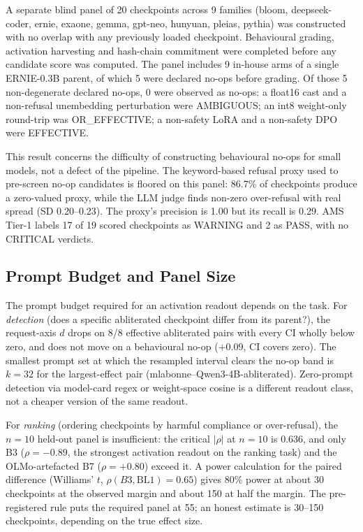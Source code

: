 \documentclass[11pt,letterpaper]{article}
\begin{document}
A separate blind panel of 20 checkpoints across 9 families (bloom, deepseek-coder, ernie, exaone, gemma, gpt-neo, hunyuan, pleias, pythia) was constructed with no overlap with any previously loaded checkpoint. Behavioural grading, activation harvesting and hash-chain commitment were completed before any candidate score was computed. The panel includes 9 in-house arms of a single ERNIE-0.3B parent, of which 5 were declared no-ops before grading. Of those 5 non-degenerate declared no-ops, 0 were observed as no-ops: a float16 cast and a non-refusal unembedding perturbation were AMBIGUOUS; an int8 weight-only round-trip was OR\_EFFECTIVE; a non-safety LoRA and a non-safety DPO were EFFECTIVE.

This result concerns the difficulty of constructing behavioural no-ops for small models, not a defect of the pipeline. The keyword-based refusal proxy used to pre-screen no-op candidates is floored on this panel: 86.7\% of checkpoints produce a zero-valued proxy, while the LLM judge finds non-zero over-refusal with real spread (SD 0.20--0.23). The proxy's precision is 1.00 but its recall is 0.29. AMS Tier-1 labels 17 of 19 scored checkpoints as WARNING and 2 as PASS, with no CRITICAL verdicts.


\subsection{Prompt Budget and Panel Size}
\label{sec:results-fewprompt}

The prompt budget required for an activation readout depends on the task. For \emph{detection} (does a specific abliterated checkpoint differ from its parent?), the request-axis $d$ drops on 8/8 effective abliterated pairs with every CI wholly below zero, and does not move on a behavioural no-op ($+0.09$, CI covers zero). The smallest prompt set at which the resampled interval clears the no-op band is $k = 32$ for the largest-effect pair (mlabonne--Qwen3-4B-abliterated). Zero-prompt detection via model-card regex or weight-space cosine is a different readout class, not a cheaper version of the same readout.

For \emph{ranking} (ordering checkpoints by harmful compliance or over-refusal), the $n = 10$ held-out panel is insufficient: the critical $|\rho|$ at $n = 10$ is 0.636, and only B3 ($\rho = -0.89$, the strongest activation readout on the ranking task) and the OLMo-artefacted B7 ($\rho = +0.80$) exceed it. A power calculation for the paired difference (Williams' $t$, $\rho(B3, \text{BL1}) = 0.65$) gives 80\% power at about 30 checkpoints at the observed margin and about 150 at half the margin. The pre-registered rule puts the required panel at 55; an honest estimate is 30--150 checkpoints, depending on the true effect size.
\end{document}
